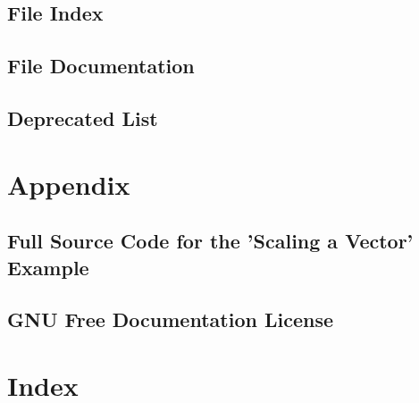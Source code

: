 \chapter{File Index}


\chapter{File Documentation}
\label{FileDocumentation}
\hypertarget{FileDocumentation}{}















































\chapter{Deprecated List}
\label{deprecated}
\hypertarget{deprecated}{}


\part{Appendix}

\chapter{Full Source Code for the ’Scaling a Vector’ Example}
\label{FullSourceCodeVectorScal}
\hypertarget{FullSourceCodeVectorScal}{}


\chapter{GNU Free Documentation License}
\label{GNUFreeDocumentationLicense}
\hypertarget{GNUFreeDocumentationLicense}{}


\part{Index}
\printindex



